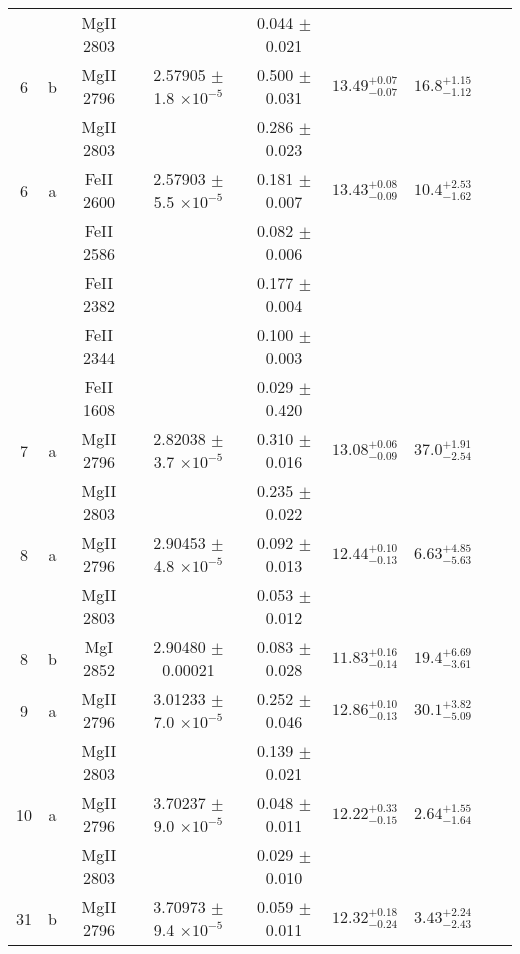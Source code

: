 \documentclass[12pt]{article}
\begin{document}
\begin{footnotesize}
\begin{longtable}{ c c c c c c c c c}
  &   & MgII     2803  &  &  0.044 $\pm$ 0.021   &   &     & 	 & \\ 
       6  & b  & MgII     2796  &  2.57905 $\pm$ 1.8 $\times 10^{-5}$   &  0.500 $\pm$ 0.031   & $13.49_{ - 0.07}^{ + 0.07}$  & $16.8_{ - 1.12}^{ + 1.15}$    & 	 & \\ 
  &   & MgII     2803  &  &  0.286 $\pm$ 0.023   &   &     & 	 & \\ 
       6  & a  & FeII     2600  &  2.57903 $\pm$ 5.5 $\times 10^{-5}$   &  0.181 $\pm$ 0.007   & $13.43_{ - 0.09}^{ + 0.08}$  & $10.4_{ - 1.62}^{ + 2.53}$    & 	 & \\ 
  &   & FeII     2586  &  &  0.082 $\pm$ 0.006   &   &     & 	 & \\ 
  &   & FeII     2382  &  &  0.177 $\pm$ 0.004   &   &     & 	 & \\ 
  &   & FeII     2344  &  &  0.100 $\pm$ 0.003   &   &     & 	 & \\ 
  &   & FeII     1608  &  &  0.029 $\pm$ 0.420   &   &     & 	 & \\ 
       7  & a  & MgII     2796  &  2.82038 $\pm$ 3.7 $\times 10^{-5}$   &  0.310 $\pm$ 0.016   & $13.08_{ - 0.09}^{ + 0.06}$  & $37.0_{ - 2.54}^{ + 1.91}$    & 	 & \\ 
  &   & MgII     2803  &  &  0.235 $\pm$ 0.022   &   &     & 	 & \\ 
       8  & a  & MgII     2796  &  2.90453 $\pm$ 4.8 $\times 10^{-5}$   &  0.092 $\pm$ 0.013   & $12.44_{ - 0.13}^{ + 0.10}$  & $6.63_{ - 5.63}^{ + 4.85}$    & 	 & \\ 
  &   & MgII     2803  &  &  0.053 $\pm$ 0.012   &   &     & 	 & \\ 
       8  & b  & MgI     2852  &  2.90480 $\pm$ 0.00021  &  0.083 $\pm$ 0.028   & $11.83_{ - 0.14}^{ + 0.16}$  & $19.4_{ - 3.61}^{ + 6.69}$    & 	 & \\ 
       9  & a  & MgII     2796  &  3.01233 $\pm$ 7.0 $\times 10^{-5}$   &  0.252 $\pm$ 0.046   & $12.86_{ - 0.13}^{ + 0.10}$  & $30.1_{ - 5.09}^{ + 3.82}$    & 	 & \\ 
  &   & MgII     2803  &  &  0.139 $\pm$ 0.021   &   &     & 	 & \\ 
      10  & a  & MgII     2796  &  3.70237 $\pm$ 9.0 $\times 10^{-5}$   &  0.048 $\pm$ 0.011   & $12.22_{ - 0.15}^{ + 0.33}$  & $2.64_{ - 1.64}^{ + 1.55}$    & 	 & \\ 
  &   & MgII     2803  &  &  0.029 $\pm$ 0.010   &   &     & 	 & \\ 
      31  & b  & MgII     2796  &  3.70973 $\pm$ 9.4 $\times 10^{-5}$   &  0.059 $\pm$ 0.011   & $12.32_{ - 0.24}^{ + 0.18}$  & $3.43_{ - 2.43}^{ + 2.24}$    & 	 & \\ 

\end{longtable}
\end{footnotesize}
\end{document}
